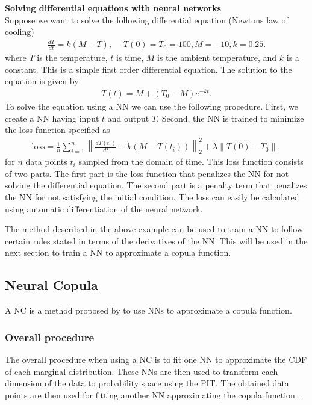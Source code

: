 \begin{example}\label{ex:NeuralNetworkDifferentialEquation}
    \textbf{Solving differential equations with neural networks}\\
    Suppose we want to solve the following differential equation (Newtons law of cooling)
    \begin{align*}
        \frac{dT}{dt} = k(M-T), \quad \; T(0) = T_0 = 100, M = -10, k = 0.25.
    \end{align*}
    where $T$ is the temperature, $t$ is time, $M$ is the ambient temperature, and $k$ is a constant. This is a simple first order differential equation. The solution to the equation is given by
    \begin{align*}
        T(t) = M + (T_0-M)e^{-kt}.
    \end{align*}
    To solve the equation using a \gls{NN} we can use the following procedure. First, we create a \gls{NN} having input $t$ and output $T$. Second, the \gls{NN} is trained to minimize the loss function specified as 
    \begin{align*}
        \mathrm{loss} = \frac{1}{n} \sum_{i=1}^{n} \left\| \frac{dT(t_i)}{dt} - k(M-T(t_i))\right\|_2^2 + \lambda \left\|T(0) - T_0\right\|,
    \end{align*}
    for $n$ data points $t_i$ sampled from the domain of time. 
    This loss function consists of two parts. The first part is the loss function that penalizes the \gls{NN} for not solving the differential equation. The second part is a penalty term that penalizes the \gls{NN} for not satisfying the initial condition. The loss can easily be calculated using automatic differentiation of the neural network. 
\end{example}
The method described in the above example can be used to train a \gls{NN} to follow certain rules stated in terms of the derivatives of the \gls{NN}. This will be used in the next section to train a \gls{NN} to approximate a copula function.  


\subsection{Neural Copula}
A \gls{NC} is a method proposed by  to use \gls{NN}s to approximate a copula function. 


\subsubsection{Overall procedure}
The overall procedure when using a \gls{NC} is to fit one \gls{NN} to approximate the \gls{CDF} of each marginal distribution. These \gls{NN}s are then used to transform each dimension of the data to probability space using the \gls{PIT}. The obtained data points are then used for fitting another \gls{NN} approximating the copula function . 

